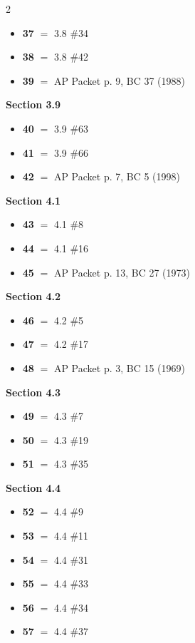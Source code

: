 \documentclass[11pt]{article}
\begin{document}
\begin{multicols}{2}
\begin{itemize}[leftmargin=1.5em,itemsep=1pt,topsep=2pt]
\item[] \textbf{37} $=$ 3.8 \#34
\item[] \textbf{38} $=$ 3.8 \#42
\item[] \textbf{39} $=$ AP Packet p. 9, BC 37 (1988)
\end{itemize}
\smallskip
\noindent\textbf{Section 3.9}
\begin{itemize}[leftmargin=1.5em,itemsep=1pt,topsep=2pt]
\item[] \textbf{40} $=$ 3.9 \#63
\item[] \textbf{41} $=$ 3.9 \#66
\item[] \textbf{42} $=$ AP Packet p. 7, BC 5 (1998)
\end{itemize}
\smallskip
\noindent\textbf{Section 4.1}
\begin{itemize}[leftmargin=1.5em,itemsep=1pt,topsep=2pt]
\item[] \textbf{43} $=$ 4.1 \#8
\item[] \textbf{44} $=$ 4.1 \#16
\item[] \textbf{45} $=$ AP Packet p. 13, BC 27 (1973)
\end{itemize}
\smallskip
\noindent\textbf{Section 4.2}
\begin{itemize}[leftmargin=1.5em,itemsep=1pt,topsep=2pt]
\item[] \textbf{46} $=$ 4.2 \#5
\item[] \textbf{47} $=$ 4.2 \#17
\item[] \textbf{48} $=$ AP Packet p. 3, BC 15 (1969)
\end{itemize}
\smallskip
\noindent\textbf{Section 4.3}
\begin{itemize}[leftmargin=1.5em,itemsep=1pt,topsep=2pt]
\item[] \textbf{49} $=$ 4.3 \#7
\item[] \textbf{50} $=$ 4.3 \#19
\item[] \textbf{51} $=$ 4.3 \#35
\end{itemize}
\smallskip
\noindent\textbf{Section 4.4}
\begin{itemize}[leftmargin=1.5em,itemsep=1pt,topsep=2pt]
\item[] \textbf{52} $=$ 4.4 \#9
\item[] \textbf{53} $=$ 4.4 \#11
\item[] \textbf{54} $=$ 4.4 \#31
\item[] \textbf{55} $=$ 4.4 \#33
\item[] \textbf{56} $=$ 4.4 \#34
\item[] \textbf{57} $=$ 4.4 \#37
\end{itemize}
\smallskip
\end{multicols}
\end{document}
